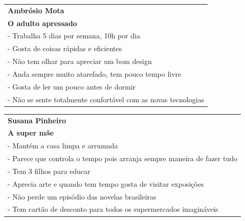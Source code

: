 \documentclass[11pt]{article}
\begin{document}
	\begin{tabularx}{\textwidth}{|X|}
		\hline
		\textbf{Ambrósio Mota} \\
		\textbf{O adulto apressado} \\
		\hline
		\hspace{5mm} - Trabalha 5 dias por semana, 10h por dia \\
		\hspace{5mm} - Gosta de coisas rápidas e eficientes \\
		\hspace{5mm} - Não tem olhar para apreciar um bom design \\
		\hspace{5mm} - Anda sempre muito atarefado, tem pouco tempo livre \\
		\hspace{5mm} - Gosta de ler um pouco antes de dormir \\
		\hspace{5mm} - Não se sente totalmente confortável com as novas tecnologias \\
		\hline
	\end{tabularx}

	\begin{tabularx}{\textwidth}{|X|}
		\hline
		\textbf{Susana Pinheiro} \\
		\textbf{A super mãe} \\
		\hline
		\hspace{5mm} - Mantém a casa limpa e arrumada \\
		\hspace{5mm} - Parece que controla o tempo pois arranja sempre maneira de fazer tudo \\
		\hspace{5mm} - Tem 3 filhos para educar \\
		\hspace{5mm} - Aprecia arte e quando tem tempo gosta de visitar exposições \\
		\hspace{5mm} - Não perde um episódio das novelas brasileiras \\
		\hspace{5mm} - Tem cartão de desconto para todos os supermercados imagináveis \\
		\hline
	\end{tabularx}
\end{document}

